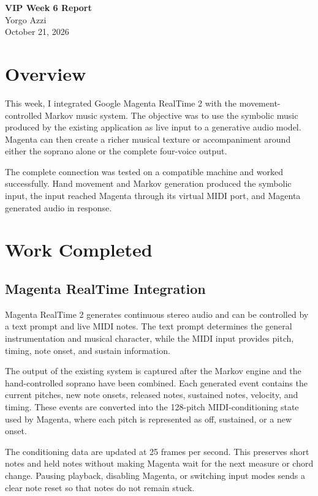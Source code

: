 \documentclass[11pt,a4paper]{article}
\begin{document}
\begin{center}
    {\Large\bfseries VIP Week 6 Report}\\[0.5em]
    {\large Yorgo Azzi}\\[0.25em]
    October 21, 2026
\end{center}

\section{Overview}

This week, I integrated Google Magenta RealTime 2 with the movement-controlled
Markov music system. The objective was to use the symbolic music produced by
the existing application as live input to a generative audio model. Magenta can
then create a richer musical texture or accompaniment around either the
soprano alone or the complete four-voice output.

The complete connection was tested on a compatible machine and worked
successfully. Hand movement and Markov generation produced the symbolic input,
the input reached Magenta through its virtual MIDI port, and Magenta generated
audio in response.

\section{Work Completed}

\subsection{Magenta RealTime Integration}

Magenta RealTime 2 generates continuous stereo audio and can be controlled by
a text prompt and live MIDI notes. The text prompt determines the general
instrumentation and musical character, while the MIDI input provides pitch,
timing, note onset, and sustain information.

The output of the existing system is captured after the Markov engine and the
hand-controlled soprano have been combined. Each generated event contains the
current pitches, new note onsets, released notes, sustained notes, velocity,
and timing. These events are converted into the 128-pitch MIDI-conditioning
state used by Magenta, where each pitch is represented as off, sustained, or a
new onset.

The conditioning data are updated at 25 frames per second. This preserves short
notes and held notes without making Magenta wait for the next measure or chord
change. Pausing playback, disabling Magenta, or switching input modes sends a
clear note reset so that notes do not remain stuck.
\end{document}
